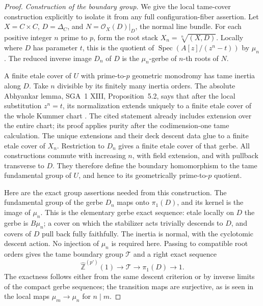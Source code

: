 \documentclass[11pt]{article}
\begin{document}
\begin{proof}
\emph{Construction of the boundary group.}
We give the local tame-cover construction explicitly to
isolate it from any full configuration-fiber assertion.
Let \(X=C\times C\), \(D=\Delta_C\), and
\(N=\mathcal O_X(D)|_D\), the normal line bundle.
For each positive integer \(n\) prime to \(p\), form
the root stack \(X_n=\sqrt[n]{(X,D)}\). Locally where
\(D\) has parameter \(t\), this is the quotient of
\(\operatorname{Spec}(A[z]/(z^n-t))\) by \(\mu_n\).
The reduced inverse image \(D_n\) of \(D\) is the
\(\mu_n\)-gerbe of \(n\)-th roots of \(N\).

A finite etale cover of \(U\) with prime-to-\(p\)
geometric monodromy has tame inertia along \(D\).
Take \(n\) divisible by its finitely many inertia
orders. The absolute Abhyankar lemma, SGA~1 XIII,
Proposition~5.2, says that after the local substitution
\(z^n=t\), its normalization extends uniquely to a
finite etale cover of the whole Kummer chart
\cite{AR_SGA1}. The cited statement already includes
extension over the entire chart; its proof applies
purity after the codimension-one tame calculation.
The unique extensions and their deck
descent data glue to a finite etale cover of \(X_n\).
Restriction to \(D_n\) gives a finite etale cover of
that gerbe. All constructions commute with increasing
\(n\), with field extension, and with pullback
transverse to \(D\). They therefore define the boundary
homomorphism to the tame fundamental group of \(U\),
and hence to its geometrically prime-to-\(p\) quotient.

Here are the exact group assertions needed from this
construction. The fundamental group of the gerbe \(D_n\)
maps onto \(\pi_1(D)\), and its kernel is the image
of \(\mu_n\). This is the elementary gerbe exact
sequence: etale locally on \(D\) the gerbe is
\(B\mu_n\); a cover on which the stabilizer acts
trivially descends to \(D\), and covers of \(D\)
pull back fully faithfully. The inertia is normal,
with the cyclotomic descent action. No injection of
\(\mu_n\) is required here. Passing to compatible
root orders gives the tame boundary group \(\mathcal T\)
and a right exact sequence
\[
 \widehat{\mathbb Z}^{(p')}(1)\longrightarrow\mathcal T
              \longrightarrow\pi_1(D)\longrightarrow1.
                                                        \tag{A.90.3}
\]
The exactness follows either from the same descent
criterion or by inverse limits of the compact gerbe
sequences; the transition maps are surjective, as is
seen in the local maps \(\mu_m\to\mu_n\) for
\(n\mid m\).


\end{proof}
\end{document}
